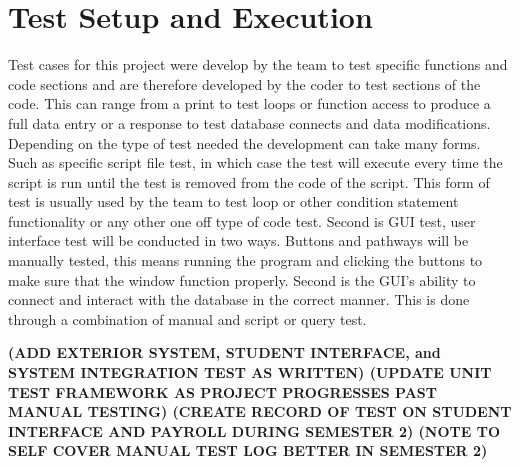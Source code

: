 \section{Test Setup and Execution}
Test cases for this project were develop by the team to test specific functions and code sections and are therefore developed by the coder to test sections of the code. This can range from a print to test loops or function access to produce a full data entry or a response to test database connects and data modifications.
Depending on the type of test needed the development can take many forms. Such as specific script file test, in which case the test will execute every time the script is run until the test is removed from the code of the script. This form of test is usually used by the team to test loop or other condition statement functionality or any other one off type of code test.
Second is GUI test, user interface test will be conducted in two ways. Buttons and pathways will be manually tested, this means running the program and clicking the buttons to make sure that the window function properly. Second is the GUI's ability to connect and interact with the database in the correct manner. This is done through a combination of manual and script or query test. 


\bf(ADD EXTERIOR SYSTEM, STUDENT INTERFACE, and SYSTEM INTEGRATION TEST AS WRITTEN)
\bf(UPDATE UNIT TEST FRAMEWORK AS PROJECT PROGRESSES PAST MANUAL TESTING)
\bf(CREATE RECORD OF TEST ON STUDENT INTERFACE AND PAYROLL DURING SEMESTER 2) 
\bf(NOTE TO SELF COVER MANUAL TEST LOG BETTER IN SEMESTER 2)
